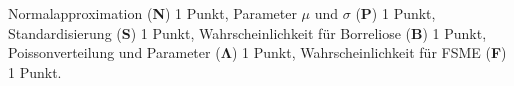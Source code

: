 \begin{bewertung}
Normalapproximation ({\bf N}) 1 Punkt,
Parameter $\mu$ und $\sigma$ ({\bf P}) 1 Punkt,
Standardisierung ({\bf S}) 1 Punkt,
Wahrscheinlichkeit für Borreliose ({\bf B}) 1 Punkt,
Poissonverteilung und Parameter ($\mathbf{\Lambda}$) 1 Punkt,
Wahrscheinlichkeit für FSME ({\bf F}) 1 Punkt.
\end{bewertung}


